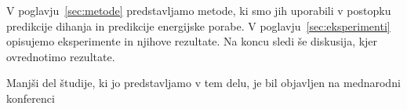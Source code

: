 V poglavju~\ref{sec:metode}  predstavljamo metode, ki smo jih uporabili v postopku predikcije dihanja in predikcije energijske porabe. V poglavju~\ref{sec:eksperimenti} opisujemo eksperimente in njihove rezultate. Na koncu sledi še diskusija, kjer ovrednotimo rezultate.

Manjši del študije, ki jo predstavljamo v tem delu, je bil objavljen na mednarodni konferenci~\cite{koporec2017observation}